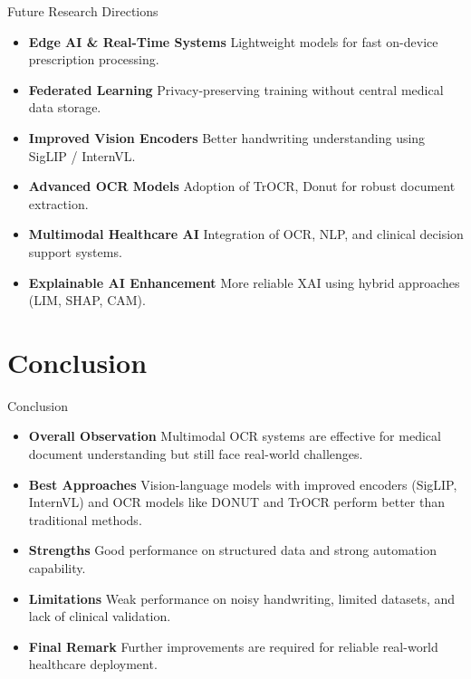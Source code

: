 \documentclass[11pt,aspectratio=169]{beamer}
\begin{document}
\begin{frame}{Future Research Directions}

\begin{itemize}

\item \textbf{Edge AI \& Real-Time Systems}  
Lightweight models for fast on-device prescription processing.

\item \textbf{Federated Learning}  
Privacy-preserving training without central medical data storage.

\item \textbf{Improved Vision Encoders}  
Better handwriting understanding using SigLIP / InternVL.

\item \textbf{Advanced OCR Models}  
Adoption of TrOCR, Donut for robust document extraction.

\item \textbf{Multimodal Healthcare AI}  
Integration of OCR, NLP, and clinical decision support systems.

\item \textbf{Explainable AI Enhancement}  
More reliable XAI using hybrid approaches (LIM, SHAP, CAM).

\end{itemize}
\end{frame}




\section{Conclusion}
\begin{frame}{Conclusion}
\begin{itemize}

\item \textbf{Overall Observation}  
Multimodal OCR systems are effective for medical document understanding but still face real-world challenges.

\item \textbf{Best Approaches}  
Vision-language models with improved encoders (SigLIP, InternVL) and OCR models like DONUT and TrOCR perform better than traditional methods.

\item \textbf{Strengths}  
Good performance on structured data and strong automation capability.

\item \textbf{Limitations}  
Weak performance on noisy handwriting, limited datasets, and lack of clinical validation.

\item \textbf{Final Remark}  
Further improvements are required for reliable real-world healthcare deployment.

\end{itemize}

\end{frame}
\end{document}
